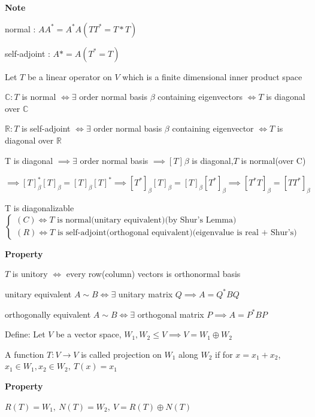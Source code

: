 \textbf{Note}
\begin{tcolorbox}
	normal : $AA^{*} = A^*A(TT^* = T*T)$
	
	self-adjoint : $A* = A(T^* = T)$
\end{tcolorbox}

\begin{thm*}
		Let $T$ be a linear operator on $V$ which is a finite dimensional inner product space
		
		$\mathbb{C}: T$ is normal $\Leftrightarrow \exists $ order normal basis $\beta$ containing eigenvectors $\Leftrightarrow T$ is diagonal over $\mathbb{C}$
		
		$\mathbb{R}: T$ is self-adjoint $\Leftrightarrow \exists$ order normal basis $\beta$ containing eigenvector $\Leftrightarrow T$ is diagonal over $\mathbb{R}$
\end{thm*}

T is diagonal $\implies \exists$ order normal basis $\implies [T]_{}\beta$ is diagonal,$T$ is normal(over C)

$\implies[T]^*_{\beta}[T]_{\beta} = [T]_{\beta}[T]^* \implies [T^*]_{\beta}[T]_{\beta} = [T]_{\beta}[T^*]_{\beta} \implies [T^*T]_{\beta} = [TT^*]_{\beta}$

T is diagonalizable $\begin{cases}
	(C)\Leftrightarrow T \text{ is normal(unitary equivalent)(by Shur's Lemma)}\\
	(R)\Leftrightarrow T \text{ is self-adjoint(orthogonal equivalent)(eigenvalue is real + Shur's)}
\end{cases}$

\textbf{Property}

$T$ is unitory $\Leftrightarrow$ every row(column) vectors is orthonormal basis

unitary equivalent $A \sim B \Leftrightarrow \exists $ unitary matrix $Q \implies A = Q^*BQ$

orthogonally equivalent $A \sim B \Leftrightarrow \exists$ orthogonal matrix $P \implies A = P^*BP$

\newpage

Define: Let $V$ be a vector space, $W_1,W_2 \leq V \implies V = W_1 \oplus W_2$

A function $T: V \rightarrow V$ is called projection on $W_1$ along $W_2$ if for $x = x_1 + x_2$, \\$x_1 \in W_1,x_2 \in W_2,~T(x) = x_1$

\textbf{Property}

$R(T) = W_1,~N(T) = W_2,~V = R(T)\oplus N(T)$

